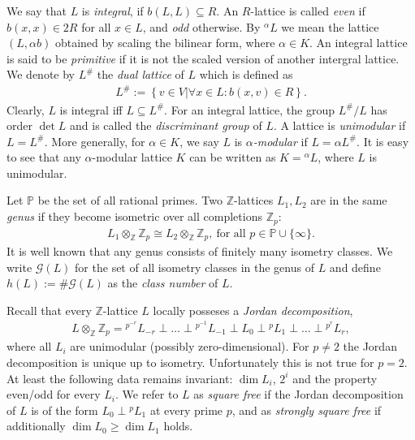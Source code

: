 \documentclass{amsart}
\theoremstyle{definition}
\theoremstyle{remark}
\def\ZZ{\mathbb{Z}}
\def\PP{\mathbb{P}}
\def\|{\left | \right.}
\begin{document}
We say that $L$ is \emph{integral}, if $b(L,L) \subseteq R$.
An $R$-lattice is called \emph{even} if $b(x,x) \in 2R$ for all $x \in L$, and \emph{odd} otherwise.
By ${}^{\alpha}\!{L}$ we mean the lattice $(L,\alpha b)$ obtained by scaling the bilinear form, where $\alpha \in K$.
An integral lattice is said to be \emph{primitive} if it is not the scaled version of another intergral lattice.
We denote by $L^{\#}$ the \emph{dual lattice} of $L$ which is defined as
\begin{align*}
 L^{\#} := \left\{ v \in V \| \forall x \in L : b(x,v) \in R \right\}.
\end{align*}
Clearly, $L$ is integral iff $L \subseteq L^{\#}$. For an integral lattice, the group $L^{\#}/L$ has order $\det L$ and is called the \emph{discriminant group} of $L$.
A lattice is \emph{unimodular} if $L = L^{\#}$.
More generally, for $\alpha \in K$, we say $L$ is \emph{$\alpha$-modular} if $L = \alpha L^{\#}$.
It is easy to see that any $\alpha$-modular lattice $K$ can be written as $K={}^{\alpha}\!{L}$, where $L$ is unimodular.

Let $\PP$ be the set of all rational primes. Two $\ZZ$-lattices $L_1, L_2$ are in the same \emph{genus} if they become isometric over all completions $\ZZ_p$:
\begin{align*}
  L_1 \otimes_{\ZZ} \ZZ_p \cong L_2 \otimes_{\ZZ} \ZZ_p, \ \text{for all $p  \in \PP \cup \{ \infty \}$}.
\end{align*}
It is well known that any genus consists of finitely many isometry classes. We write $\mathcal{G}(L)$ for the set of all isometry classes in the genus of $L$ and 
define $h(L):=\# \mathcal{G}(L)$ as the \emph{class number} of $L$.

Recall that every $\ZZ$-lattice $L$ locally posseses a \emph{Jordan decomposition},
\begin{align}
 L \otimes_{\ZZ} \ZZ_p = {}^{p^{-r}}\!{L_{-r}} \perp \dots \perp {}^{p^{-1}}\!{L_{-1}} \perp L_0 \perp {}^{p}\!{L_1} \perp \dots \perp {}^{p^r}\!{L_r},
\end{align}
where all $L_i$ are unimodular (possibly zero-dimensional). For $p \neq 2$ the Jordan decomposition is unique up to isometry. 
Unfortunately this is not true for $p = 2$. At least the following data remains invariant: $\dim L_i$, $2^i$ and the property even/odd for every $L_i$. 
We refer to $L$ as \emph{square free} if the Jordan decomposition of $L$ is of the form $L_0 \perp {}^{p}\!{L_1}$ at every prime $p$, and as \emph{strongly square free} 
if additionally $\dim L_0 \geq \dim L_1$ holds. 
\end{document}
